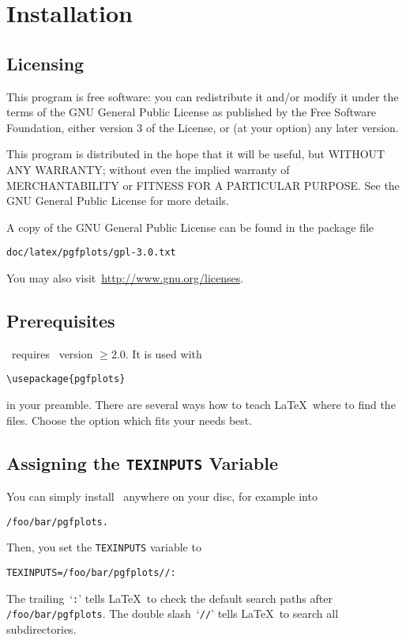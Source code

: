 
\section{Installation}
\subsection{Licensing}
This program is free software: you can redistribute it and/or modify
it under the terms of the GNU General Public License as published by
the Free Software Foundation, either version 3 of the License, or
(at your option) any later version.

This program is distributed in the hope that it will be useful,
but WITHOUT ANY WARRANTY; without even the implied warranty of
MERCHANTABILITY or FITNESS FOR A PARTICULAR PURPOSE.  See the
GNU General Public License for more details.

A copy of the GNU General Public License can be found in the package file
\begin{lstlisting}
doc/latex/pgfplots/gpl-3.0.txt
\end{lstlisting}
You may also visit~\url{http://www.gnu.org/licenses}.

\subsection{Prerequisites}
\PGFPlots\ requires \PGF\ version $\ge 2.0$.
It is used with
\begin{lstlisting}
\usepackage{pgfplots}
\end{lstlisting}
in your preamble. There are several ways how to teach \LaTeX\ where to find the files. Choose the option which fits your needs best.

\subsection{Assigning the \texttt{TEXINPUTS} Variable}
You can simply install \PGFPlots\ anywhere on your disc, for example into
\begin{lstlisting}
/foo/bar/pgfplots.
\end{lstlisting}
Then, you set the \texttt{TEXINPUTS} variable to
\begin{lstlisting}
TEXINPUTS=/foo/bar/pgfplots//:
\end{lstlisting}
The trailing~`\texttt{:}' tells \LaTeX\ to check the default search paths after \lstinline!/foo/bar/pgfplots!. The double slash~`\texttt{//}' tells \LaTeX\ to search all subdirectories.

